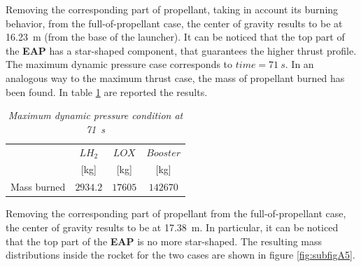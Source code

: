 \documentclass[12pt,fleqn,openany]{book} %
\begin{document}
\noindent Removing the corresponding part of propellant, taking in account its burning behavior, from the full-of-propellant case, the center of gravity results to be at \SI{16.23}{m} (from the base of the launcher). It can be noticed that the top part of the \textbf{EAP} has a star-shaped component, that guarantees the higher thrust profile. The maximum dynamic pressure case corresponds to $time = \SI{71}{s}$. In an analogous way to the maximum thrust case, the mass of propellant burned has been found. In table \hypertarget{tab:maxP}{\ref{tab:maxP}} are reported the results.  

\begin{table}[h]
	\centering
	\begin{tabular}{ l c c c}
\toprule
										&$LH_2$ 			&$LOX$ 				&$Booster$	\\
										&[\si{\kilogram}]			&[\si{\kilogram}]			&[\si{\kilogram}]		\\
\midrule                                                                                                             
Mass burned								&$2934.2$			&$17605$			&$142670$			\\
\bottomrule
\end{tabular} 
\caption{\emph{Maximum dynamic pressure condition at \SI{71}{s}}}        
\label{tab:maxP}                       
\end{table} 
\noindent Removing the corresponding part of propellant from the full-of-propellant case, the center of gravity results to be at \SI{17.38}{m}. In particular, it can be noticed that the top part of the \textbf{EAP} is no more star-shaped. The resulting mass distributions inside the rocket for the two cases are shown in figure \hypertarget{fig:subfigA5}{\ref{fig:subfigA5}}. 
\end{document}
